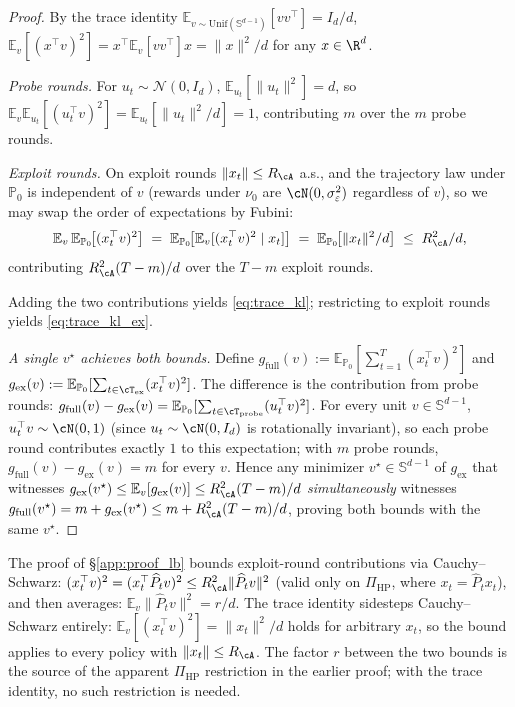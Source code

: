 \begin{proof}
By the trace identity
$\mathbb E_{v\sim\mathrm{Unif}(\mathbb S^{d-1})}[v v^\top] = I_d/d$,
$\mathbb E_v[(x^\top v)^2] = x^\top \mathbb E_v[vv^\top] x = \|x\|^2/d$
for any $x\in\R^d$.

\emph{Probe rounds.} For $u_t\sim\mathcal N(0,I_d)$,
$\mathbb E_{u_t}[\|u_t\|^2]=d$, so
$\mathbb E_v\mathbb E_{u_t}[(u_t^\top v)^2]=\mathbb E_{u_t}[\|u_t\|^2/d]=1$,
contributing $m$ over the $m$ probe rounds.

\emph{Exploit rounds.} On exploit rounds $\|x_t\|\le R_\cA$ a.s., and
the trajectory law under $\mathbb P_0$ is independent of $v$ (rewards
under $\nu_0$ are $\cN(0,\sigma_\varepsilon^2)$ regardless of $v$), so
we may swap the order of expectations by Fubini:
\[
\mathbb E_v\,\mathbb E_{\mathbb P_0}\!\bigl[(x_t^\top v)^2\bigr]
\;=\; \mathbb E_{\mathbb P_0}\!\bigl[\mathbb E_v[(x_t^\top v)^2\mid x_t]\bigr]
\;=\; \mathbb E_{\mathbb P_0}\!\bigl[\|x_t\|^2/d\bigr] \;\le\; R_\cA^2/d,
\]
contributing $R_\cA^2(T-m)/d$ over the $T-m$ exploit rounds.

Adding the two contributions yields \eqref{eq:trace_kl}; restricting
to exploit rounds yields \eqref{eq:trace_kl_ex}.

\emph{A single $v^\star$ achieves both bounds.} Define
$g_{\mathrm{full}}(v) := \mathbb E_{\mathbb P_0}[\sum_{t=1}^T(x_t^\top v)^2]$
and
$g_{\mathrm{ex}}(v) := \mathbb E_{\mathbb P_0}[\sum_{t\in\cT_{\mathrm{ex}}}(x_t^\top v)^2]$.
The difference is the contribution from probe rounds:
$g_{\mathrm{full}}(v) - g_{\mathrm{ex}}(v)
= \mathbb E_{\mathbb P_0}[\sum_{t\in\cT_{\mathrm{probe}}}(u_t^\top v)^2]$.
For every unit $v\in\mathbb S^{d-1}$, $u_t^\top v\sim \cN(0,1)$ (since
$u_t\sim\cN(0,I_d)$ is rotationally invariant), so each probe round
contributes exactly $1$ to this expectation; with $m$ probe rounds,
$g_{\mathrm{full}}(v) - g_{\mathrm{ex}}(v) = m$ for every $v$. Hence
any minimizer $v^\star\in\mathbb S^{d-1}$ of $g_{\mathrm{ex}}$ that
witnesses $g_{\mathrm{ex}}(v^\star)\le \mathbb E_v[g_{\mathrm{ex}}(v)]
\le R_\cA^2(T-m)/d$ \emph{simultaneously} witnesses
$g_{\mathrm{full}}(v^\star) = m + g_{\mathrm{ex}}(v^\star)\le m + R_\cA^2(T-m)/d$,
proving both bounds with the same $v^\star$.
\end{proof}

\begin{remark}
\label{rem:trace_vs_cs}
The proof of \S\ref{app:proof_lb} bounds exploit-round contributions
via Cauchy--Schwarz:
$(x_t^\top v)^2 = (x_t^\top \widehat P_t v)^2 \le R_\cA^2\|\widehat P_t v\|^2$
(valid only on $\Pi_{\mathrm{HP}}$, where $x_t = \widehat P_t x_t$),
and then averages: $\mathbb E_v\|\widehat P_t v\|^2 = r/d$.
The trace identity sidesteps Cauchy--Schwarz entirely:
$\mathbb E_v[(x_t^\top v)^2] = \|x_t\|^2/d$ holds for arbitrary $x_t$,
so the bound applies to every policy with $\|x_t\|\le R_\cA$.
The factor $r$ between the two bounds is the source of the apparent
$\Pi_{\mathrm{HP}}$ restriction in the earlier proof; with the trace
identity, no such restriction is needed.
\end{remark}

